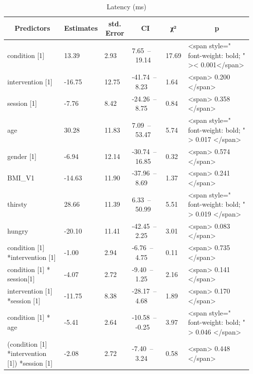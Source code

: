 \documentclass[
]{article}
\begin{document}
\begin{table}[H]

\caption{\label{tab:PAV_RT_mod}Latency (ms)}
\centering
\begin{tabular}[t]{l|l|l|l|l|l}
\hline
\multicolumn{1}{c}{\textbf{Predictors}} & \multicolumn{1}{c}{\textbf{Estimates}} & \multicolumn{1}{c}{\textbf{std. Error}} & \multicolumn{1}{c}{\textbf{CI}} & \multicolumn{1}{c}{\textbf{χ²}} & \multicolumn{1}{c}{\textbf{p}}\\
\hline
condition [1] & 13.39 & 2.93 & 7.65 – 19.14 & 17.69 & <span style=" font-weight: bold;    " >< 0.001</span>\\
\hline
intervention [1] & -16.75 & 12.75 & -41.74 – 8.23 & 1.64 & <span> 0.200 </span>\\
\hline
session [1] & -7.76 & 8.42 & -24.26 – 8.75 & 0.84 & <span> 0.358 </span>\\
\hline
age & 30.28 & 11.83 & 7.09 – 53.47 & 5.74 & <span style=" font-weight: bold; " > 0.017 </span>\\
\hline
gender [1] & -6.94 & 12.14 & -30.74 – 16.85 & 0.32 & <span> 0.574 </span>\\
\hline
BMI_V1 & -14.63 & 11.90 & -37.96 – 8.69 & 1.37 & <span> 0.241 </span>\\
\hline
thirsty & 28.66 & 11.39 & 6.33 – 50.99 & 5.51 & <span style=" font-weight: bold; " > 0.019 </span>\\
\hline
hungry & -20.10 & 11.41 & -42.45 – 2.25 & 3.01 & <span> 0.083 </span>\\
\hline
condition [1] *intervention [1] & -1.00 & 2.94 & -6.76 – 4.75 & 0.11 & <span> 0.735 </span>\\
\hline
condition [1] * session[1] & -4.07 & 2.72 & -9.40 – 1.25 & 2.16 & <span> 0.141 </span>\\
\hline
intervention [1] *session [1] & -11.75 & 8.38 & -28.17 – 4.68 & 1.89 & <span> 0.170 </span>\\
\hline
condition [1] * age & -5.41 & 2.64 & -10.58 – -0.25 & 3.97 & <span style=" font-weight: bold; " > 0.046 </span>\\
\hline
(condition [1] *intervention [1]) *session [1] & -2.08 & 2.72 & -7.40 – 3.24 & 0.58 & <span> 0.448 </span>\\
\hline
\end{tabular}
\end{table}
\end{document}
